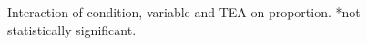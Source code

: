 \documentclass{article}
\begin{document}
\begin{figure}[H]
  \caption{Interaction of condition, variable and TEA on proportion. *not statistically significant.}
  \noindent{}
  \centering
\end{figure}
\end{document}
